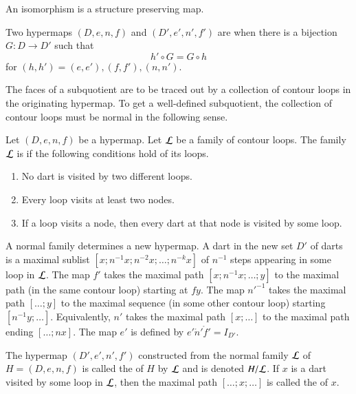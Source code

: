 An isomorphism is a structure preserving map.

\begin{definition}[isomorphism]
 Two hypermaps $(D,e,n,f)$ and
$(D',e',n',f')$ are  when there is a bijection
$G:D\to D'$ such that
\[ h'\circ G = G\circ h\] 
for $(h,h')=(e,e'), (f,f'), (n,n')$.
%
%
\end{definition}

The faces of a subquotient are to be traced out by a collection of contour loops
in the originating hypermap.  To get a well-defined subquotient, the collection
of contour loops must be normal in the following sense.

\begin{definition}
Let $(D,e,n,f)$ be a hypermap. 
Let $\cal L$ be a family of contour
loops.  The family $\cal L$ is   if the following
conditions hold of its loops. \begin{enumerate}
\item  No dart is visited by two different loops.
\item  Every loop visits at least two nodes.
\item  If a loop visits a node, then every dart at that node is visited
by some loop.
\end{enumerate}
%
\end{definition}


A normal family determines a new hypermap.  A dart in the new set $D'$
of darts is a maximal sublist $[x;n^{-1} x; n^{-2} x;\ldots;n^{-k}
x]$ of $n^{-1}$ steps appearing in some loop in $\cal L$. The map $f'$
takes the maximal path $[x;n^{-1}x;\ldots;y]$ to the maximal path (in
the same contour loop) starting at $f y$. The map ${n'}^{-1}$ takes
the maximal path $[\ldots;y]$ to the maximal sequence (in some other
contour loop) starting $[n^{-1}y;\ldots]$. Equivalently, $n'$ takes
the maximal path $[x;\ldots]$ to the maximal path ending $[\ldots;n
x]$. The map $e'$ is defined by $e'\ocirc n'\ocirc f' = I_{D'}$.
%

\begin{definition}[subquotient]
 The hypermap $(D',e',n',f')$
constructed from the normal
family $\cal L$ of $H=(D,e,n,f)$ 
is called the  of $H$ by $\cal L$ and is denoted
$H/{\cal L}$.  If $x$ is a dart visited by some loop in $\cal L$, then
the maximal path $[\ldots;x;\ldots]$ is called the  of $x$.
%
\end{definition}
%
%
%
%


